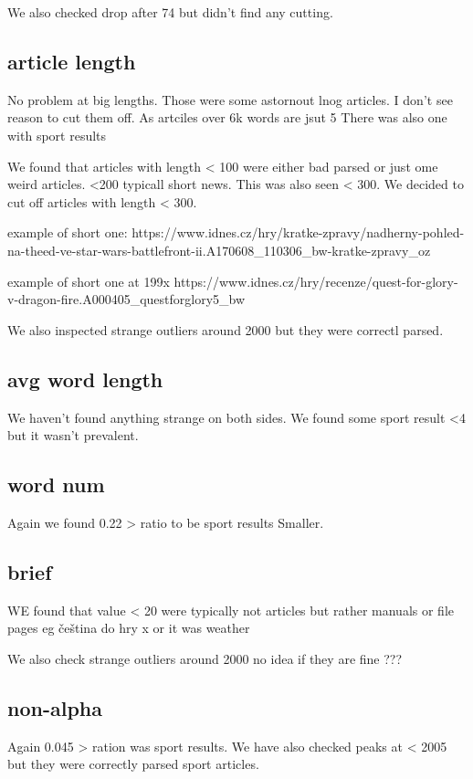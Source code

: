 \documentclass{article}
\begin{document}
    We also checked drop after 74 but didn't find any cutting.
    \subsection{article length}
    No problem at big lengths. Those were some astornout lnog articles. I don't see reason to cut them off. As artciles over 6k words are jsut 5%
    There was also one with sport results

    We found that articles with length < 100 were either bad parsed or just ome weird articles. <200 typicall short news.
    This was also seen < 300. We decided to cut off articles with length < 300.

    example of short one: https://www.idnes.cz/hry/kratke-zpravy/nadherny-pohled-na-theed-ve-star-wars-battlefront-ii.A170608_110306_bw-kratke-zpravy_oz

    example of short one at 199x https://www.idnes.cz/hry/recenze/quest-for-glory-v-dragon-fire.A000405_questforglory5_bw


    We also inspected strange outliers around 2000 but they were correctl parsed.



    \subsection{avg word length}
    We haven't found anything strange on both sides. We found some sport result <4 but it wasn't prevalent.

    \subsection{word num}
    Again we found 0.22 > ratio to be sport results Smaller.
    



    \subsection{brief}
        WE found that value < 20 were typically not articles but rather manuals or file pages eg čeština do hry x or it was weather

        We also check strange outliers around 2000 no idea if they are fine ???


    \subsection{non-alpha}
    Again 0.045 > ration was sport results. We have also checked peaks at < 2005 but they were correctly parsed sport articles.
\end{document}
